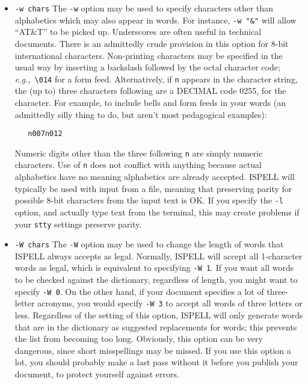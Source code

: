 \begin{itemize}
\item {\Large\tt -w chars}\sunspec{\\}{}
The \verb+-w+ option may be used to specify characters other than alphabetics
which may also appear in words.
For instance, \verb+-w "&"+ will allow ``AT\&T'' to be picked up.
Underscores are often useful in technical documents.
There is an admittedly crude provision in this option for 8-bit international
characters.
Non-printing characters may be specified in the usual way by inserting a
backslash followed by the octal character code; {\it{e.g.,}}\ \verb+\014+ for a
form feed.
Alternatively, if \verb+n+ appears in the character string, the (up to) three
characters following are a DECIMAL code 0\sunspec{--}{-}255, for the character.
For example, to include bells and form feeds in your words (an admittedly silly
thing to do, but aren't most pedagogical examples):

\begin{verbatim}
   n007n012
\end{verbatim}

Numeric digits other than the three following \verb+n+ are simply numeric
characters.  Use of \verb+n+ does not conflict with anything because actual
alphabetics have no meaning \sunspec{--}{-} alphabetics are already accepted.
ISPELL will typically be used with input from a file, meaning that preserving
parity for possible 8-bit characters from the input text is OK\@.
If you specify the \verb+-l+ option, and actually type text from the terminal,
this may create problems if your \verb+stty+ settings preserve parity.

\item {\Large\tt -W chars}\sunspec{\\}{}
The \verb+-W+ option may be used to change the length of words that ISPELL
always accepts as legal.
Normally, ISPELL will accept all 1-character words as legal, which is equivalent
to specifying \verb+-W 1+\@.
If you want all words to be checked against the dictionary, regardless of
length, you might want to specify \verb+-W 0+\@.
On the other hand, if your document specifies a lot of three-letter acronyms,
you would specify \verb+-W 3+ to accept all words of three letters or less.
Regardless of the setting of this option, ISPELL will only generate words that
are in the dictionary as suggested replacements for words; this prevents the
list from becoming too long.  Obviously, this option can be very dangerous,
since short misspellings may be missed.  If you use this option a lot, you
should probably make a last pass without it before you publish your document,
to protect yourself against errors.


\end{itemize}
